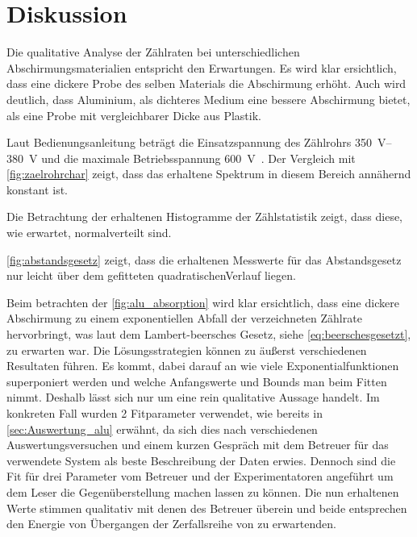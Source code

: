 \documentclass[12pt,english,ngerman]{scrartcl}
\begin{document}
\section{Diskussion}\label{sec:diskussion}

Die qualitative Analyse der Zählraten bei unterschiedlichen
Abschirmungsmaterialien entspricht den Erwartungen. Es wird klar ersichtlich,
dass eine dickere Probe des selben Materials die Abschirmung erhöht. Auch wird
deutlich, dass Aluminium, als dichteres Medium eine bessere Abschirmung bietet,
als eine Probe mit vergleichbarer Dicke aus Plastik.

Laut Bedienungsanleitung beträgt die Einsatzspannung des Zählrohrs
\SIrange{350}{380}{\volt} und die maximale Betriebsspannung
\SI{600}{\volt}~\cite{zaehlrohrdoku}. Der Vergleich mit
\autoref{fig:zaelrohrchar} zeigt, dass das erhaltene Spektrum in diesem Bereich
annähernd konstant ist.

Die Betrachtung der erhaltenen Histogramme der Zählstatistik zeigt, dass diese,
wie erwartet, normalverteilt sind.

\autoref{fig:abstandsgesetz} zeigt, dass die erhaltenen Messwerte für das Abstandsgesetz
nur leicht über dem gefitteten quadratischenVerlauf liegen.

Beim betrachten der \autoref{fig:alu_absorption} wird klar ersichtlich, dass
eine dickere Abschirmung zu einem exponentiellen Abfall der verzeichneten
Zählrate hervorbringt, was laut dem Lambert-beersches Gesetz, siehe
\autoref{eq:beerschesgesetzt}, zu erwarten war. Die Lösungsstrategien können zu
äußerst verschiedenen Resultaten führen. Es kommt, dabei darauf an wie viele
Exponentialfunktionen superponiert werden und welche Anfangswerte und Bounds
man beim Fitten nimmt. Deshalb lässt sich nur um eine rein qualitative Aussage
handelt. Im konkreten Fall wurden 2 Fitparameter verwendet, wie bereits in
\autoref{sec:Auswertung_alu} erwähnt, da sich dies nach verschiedenen
Auswertungsversuchen und einem kurzen Gespräch mit dem Betreuer für das
verwendete System als beste Beschreibung der Daten erwies. Dennoch sind die Fit
für drei Parameter vom Betreuer und der Experimentatoren angeführt um dem Leser
die Gegenüberstellung machen lassen zu können. Die nun erhaltenen Werte stimmen
qualitativ mit denen des Betreuer überein und beide entsprechen den Energie von
Übergangen der Zerfallsreihe von  zu erwartenden.

\end{document}
